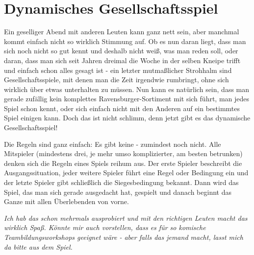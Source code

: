 \documentclass[a5paper,pagesize,10pt,bibtotoc,pointlessnumbers,normalheadings,DIV=9,twoside=false]{scrbook}
\begin{document}

\chapter{Dynamisches Gesellschaftsspiel}

Ein geselliger Abend mit anderen Leuten kann ganz nett sein, aber manchmal kommt einfach nicht so wirklich Stimmung auf.
Ob es nun daran liegt, dass man sich noch nicht so gut kennt und deshalb nicht weiß, was man reden soll, oder daran, dass man sich seit Jahren dreimal die Woche in der selben Kneipe trifft und einfach schon alles gesagt ist - ein letzter mutmaßlicher Strohhalm sind Gesellschaftsspiele, mit denen man die Zeit irgendwie rumbringt, ohne sich wirklich über etwas unterhalten zu müssen.
Nun kann es natürlich sein, dass man gerade zufällig kein komplettes Ravensburger-Sortiment mit sich führt, man jedes Spiel schon kennt, oder sich einfach nicht mit den Anderen auf ein bestimmtes Spiel einigen kann.
Doch das ist nicht schlimm, denn jetzt gibt es das dynamische Gesellschaftsspiel!

Die Regeln sind ganz einfach: Es gibt keine - zumindest noch nicht.
Alle Mitspieler (mindestens drei, je mehr umso komplizierter, am besten betrunken) denken sich die Regeln eines Spiels reihum aus.
Der erste Spieler beschreibt die Ausgangssituation, jeder weitere Spieler führt eine Regel oder Bedingung ein und der letzte Spieler gibt schließlich die Siegesbedingung bekannt.
Dann wird das Spiel, das man sich gerade ausgedacht hat, gespielt und danach beginnt das Ganze mit allen Überlebenden von vorne.

\emph{Ich hab das schon mehrmals ausprobiert und mit den richtigen Leuten macht das wirklich Spaß. Könnte mir auch vorstellen, dass es für so komische Teambildungsworkshops geeignet wäre - aber falls das jemand macht, lasst mich da bitte aus dem Spiel.}
\end{document}
